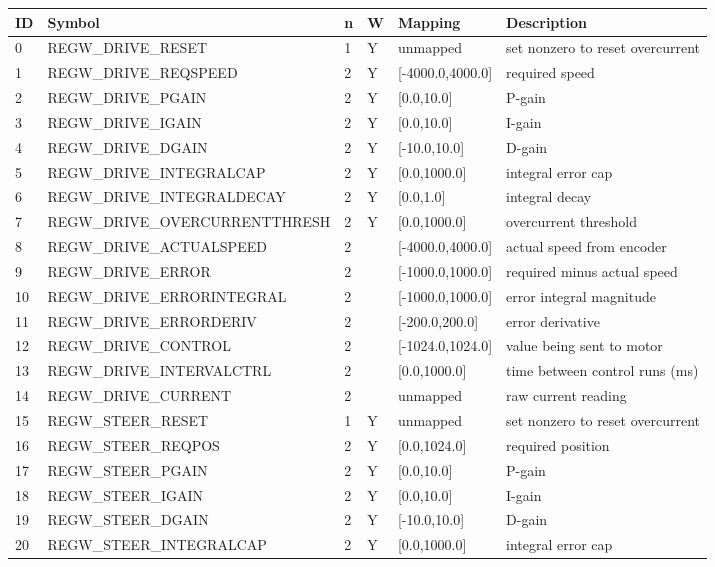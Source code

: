 \begin{tabular}{|p{0.2in}|p{2.7in}|p{0.1in}|p{0.1in}|p{1in}|p{1.5in}|}\hline
\textbf{ID} & \textbf{Symbol} & \textbf{n} & \textbf{W} & \textbf{Mapping} & \textbf{Description}  \\ \hline 
0 & REGW\_DRIVE\_RESET & 1 & Y & unmapped & set nonzero to reset overcurrent\\ \hline
1 & REGW\_DRIVE\_REQSPEED & 2 & Y & [-4000.0,4000.0] & required speed\\ \hline
2 & REGW\_DRIVE\_PGAIN & 2 & Y & [0.0,10.0] & P-gain\\ \hline
3 & REGW\_DRIVE\_IGAIN & 2 & Y & [0.0,10.0] & I-gain\\ \hline
4 & REGW\_DRIVE\_DGAIN & 2 & Y & [-10.0,10.0] & D-gain\\ \hline
5 & REGW\_DRIVE\_INTEGRALCAP & 2 & Y & [0.0,1000.0] & integral error cap\\ \hline
6 & REGW\_DRIVE\_INTEGRALDECAY & 2 & Y & [0.0,1.0] & integral decay\\ \hline
7 & REGW\_DRIVE\_OVERCURRENTTHRESH & 2 & Y & [0.0,1000.0] & overcurrent threshold\\ \hline
8 & REGW\_DRIVE\_ACTUALSPEED & 2 &  & [-4000.0,4000.0] & actual speed from encoder\\ \hline
9 & REGW\_DRIVE\_ERROR & 2 &  & [-1000.0,1000.0] & required minus actual speed\\ \hline
10 & REGW\_DRIVE\_ERRORINTEGRAL & 2 &  & [-1000.0,1000.0] & error integral magnitude\\ \hline
11 & REGW\_DRIVE\_ERRORDERIV & 2 &  & [-200.0,200.0] & error derivative\\ \hline
12 & REGW\_DRIVE\_CONTROL & 2 &  & [-1024.0,1024.0] & value being sent to motor\\ \hline
13 & REGW\_DRIVE\_INTERVALCTRL & 2 &  & [0.0,1000.0] & time between control runs (ms)\\ \hline
14 & REGW\_DRIVE\_CURRENT & 2 &  & unmapped & raw current reading\\ \hline
15 & REGW\_STEER\_RESET & 1 & Y & unmapped & set nonzero to reset overcurrent\\ \hline
16 & REGW\_STEER\_REQPOS & 2 & Y & [0.0,1024.0] & required position\\ \hline
17 & REGW\_STEER\_PGAIN & 2 & Y & [0.0,10.0] & P-gain\\ \hline
18 & REGW\_STEER\_IGAIN & 2 & Y & [0.0,10.0] & I-gain\\ \hline
19 & REGW\_STEER\_DGAIN & 2 & Y & [-10.0,10.0] & D-gain\\ \hline
20 & REGW\_STEER\_INTEGRALCAP & 2 & Y & [0.0,1000.0] & integral error cap\\ \hline
\end{tabular}

